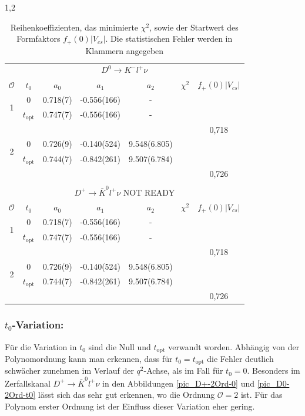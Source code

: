\documentclass[11pt,a4paper,twoside]{report}
\begin{document}
\begin{spacing}{1,2}
 \renewcommand{\arraystretch}{1.2}
\begin{table}[h]
 \begin{tabular}{cc|ccccc}
 \toprule
  \multicolumn{7}{c}{$D^0 \rightarrow  K^- l^+ \nu$} \\
   $\mathcal{O}$ & $t_0$ & $a_0$ & $a_1$ & $a_2$ & $\chi^2$ & $f_+(0)|V_{cs}|$\\
   \midrule
   \multirow{2}{*}{1} & 0 & 0.718(7) & -0.556(166) & - &\\
   & $t_\text{opt}$ & 0.747(7) & -0.556(166) & -\\
   & & & &  & &0,718 \\
   \hline
      \multirow{2}{*}{2} & 0 & 0.726(9) & -0.140(524) & 9.548(6.805)\\
   & $t_\text{opt}$ & 0.744(7) & -0.842(261) & 9.507(6.784)\\
     & & & & & &0,726 \\
     \multicolumn{7}{c}{}\\
     \midrule\midrule
   \multicolumn{7}{c}{$D^+ \rightarrow  \bar K^0 l^+ \nu$ NOT READY} \\
   $\mathcal{O}$ & $t_0$ & $a_0$ & $a_1$ & $a_2$ & $\chi^2$ &$f_+(0)|V_{cs}|$\\
   \midrule
   \multirow{2}{*}{1} & 0 & 0.718(7) & -0.556(166) & - &\\
   & $t_\text{opt}$ & 0.747(7) & -0.556(166) & -\\
   & & & & && 0,718 \\
   \hline
      \multirow{2}{*}{2} & 0 & 0.726(9) & -0.140(524) & 9.548(6.805)\\
   & $t_\text{opt}$ & 0.744(7) & -0.842(261) & 9.507(6.784)\\
     & & & & & &0,726 \\
     \bottomrule\bottomrule
 \end{tabular}
\caption{Reihenkoeffizienten, das minimierte $\chi^2$, sowie der Startwert des Formfaktors $f_+(0)|V_{cs}|$. Die statistischen Fehler werden in Klammern
angegeben}
\label{tab_ResChiF0Ai}
\end{table}
 \renewcommand{\arraystretch}{1.0}

\noindent
\subsubsection*{$t_0$-Variation:}
Für die Variation in $t_0$ sind die Null und $t_\text{opt}$ verwandt worden. Abhängig von der Polynomordnung kann man erkennen, dass für 
$t_0 = t_\text{opt}$ die Fehler deutlich schwächer zunehmen im Verlauf der $q^2$-Achse, als im Fall für $t_0 = 0$. Besonders im Zerfallskanal $D^+ \rightarrow \bar K^0 l^+ \nu$
in den Abbildungen \ref{pic_D+-2Ord-0} und \ref{pic_D0-2Ord-t0} lässt sich das sehr gut erkennen, wo die Ordnung $\mathcal{O} = 2$ ist. Für das Polynom
erster Ordnung ist der Einfluss dieser Variation eher gering. 


\end{spacing}
\end{document}
